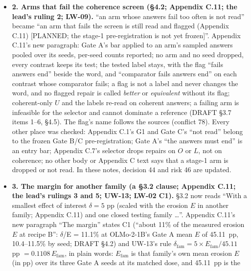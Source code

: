 \documentclass{article}
\theoremstyle{plain}
\theoremstyle{definition}
\theoremstyle{remark}
\begin{document}
\begin{itemize}
        Appendix C.7's ``drops a repair whose adverse estimate of $O$ or $L$
        passes its limit'' is unchanged; Appendix C.11 says that the screen uses
        the same bound.
  \item \textbf{2. Arms that fail the coherence screen (\S{}4.2; Appendix C.11;
        the lead's ruling 2; LW-09).} ``an arm whose answers fail too often is
        not read'' became ``an arm that fails the screen is still read and
        flagged (Appendix C.11) [PLANNED; the stage-1 pre-registration is not
        yet frozen]''. Appendix C.11's new paragraph: Gate A's bar applied to an
        arm's sampled answers pooled over its seeds, per-seed counts reported;
        no arm and no seed dropped, every contrast keeps its test; the tested
        label stays, with the flag ``fails answers end'' beside the word, and
        ``comparator fails answers end'' on each contrast whose comparator
        fails; a flag is not a label and never changes the word, and no flagged
        repair is called \emph{better} or \emph{equivalent} without its flag;
        coherent-only $U$ and the labels re-read on coherent answers; a failing
        arm is infeasible for the selector and cannot dominate a reference
        (DRAFT \S{}3.7 items 1--6, \S{}4.5). The flag's name follows the sources
        (conflict 78). Every other place was checked: Appendix C.1's G1 and Gate
        C's ``not read'' belong to the frozen Gate B/C pre-registration; Gate
        A's ``the answers must end'' is an entry bar; Appendix C.7's selector
        drops repairs on $O$ or $L$, not on coherence; no other body or Appendix
        C text says that a stage-1 arm is dropped or not read. In these notes,
        decision 44 and risk 46 are updated.
  \item \textbf{3. The margin for another family (a \S{}3.2 clause; Appendix
        C.11; the lead's rulings 3 and 5; UW-13; LW-02 C1).} \S{}3.2 now reads
        ``With a smallest effect of interest $\delta = 5$ pp (scaled with the
        erosion $E$ in another family; Appendix C.11) and one closed testing
        family \ldots{}''. Appendix C.11's new paragraph ``The margin'' states
        C1 (``about 11\% of the measured erosion $E$ at recipe B'': $\delta$/E =
        11.1\% at OLMo-2-1B's Gate A mean $E$ of 45.11~pp, 10.4--11.5\% by seed;
        DRAFT \S{}4.2) and UW-13's rule $\delta_{\mathrm{fam}} = 5 \times
        E_{\mathrm{fam}} / 45.11$ pp $= 0.1108\,E_{\mathrm{fam}}$, in plain
        words: $E_{\mathrm{fam}}$ is that family's own mean erosion $E$ (in pp)
        over its three Gate A seeds at its matched dose, and 45.11~pp is the

\end{itemize}
\end{document}
